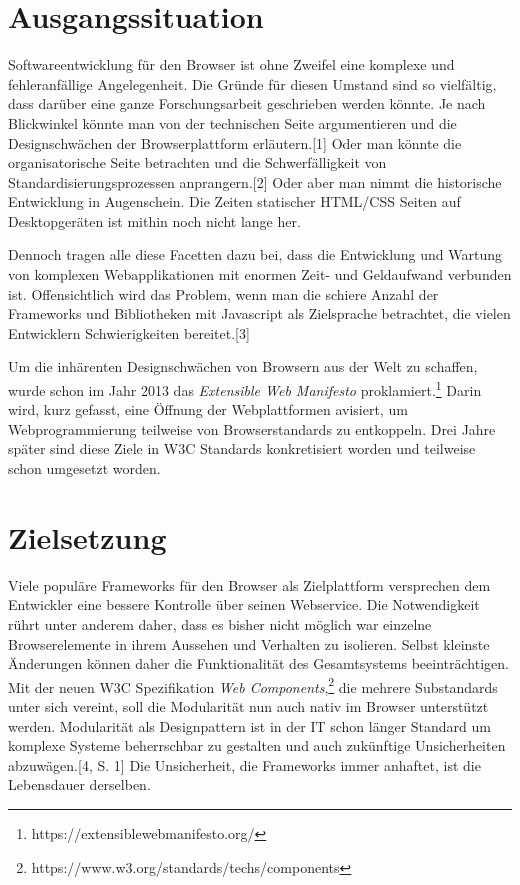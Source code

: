 \section{Ausgangssituation}\label{ausgangssituation}

Softwareentwicklung für den Browser ist ohne Zweifel eine komplexe und
fehleranfällige Angelegenheit. Die Gründe für diesen Umstand sind so
vielfältig, dass darüber eine ganze Forschungsarbeit geschrieben werden
könnte. Je nach Blickwinkel könnte man von der technischen Seite
argumentieren und die Designschwächen der Browserplattform
erläutern.{[}1{]} Oder man könnte die organisatorische Seite betrachten
und die Schwerfälligkeit von Standardisierungsprozessen
anprangern.{[}2{]} Oder aber man nimmt die historische Entwicklung in
Augenschein. Die Zeiten statischer HTML/CSS Seiten auf Desktopgeräten
ist mithin noch nicht lange her.

Dennoch tragen alle diese Facetten dazu bei, dass die Entwicklung und
Wartung von komplexen Webapplikationen mit enormen Zeit- und Geldaufwand
verbunden ist. Offensichtlich wird das Problem, wenn man die schiere
Anzahl der Frameworks und Bibliotheken mit Javascript als Zielsprache
betrachtet, die vielen Entwicklern Schwierigkeiten bereitet.{[}3{]}

Um die inhärenten Designschwächen von Browsern aus der Welt zu schaffen,
wurde schon im Jahr 2013 das \emph{Extensible Web Manifesto}
proklamiert.\footnote{https://extensiblewebmanifesto.org/} Darin wird,
kurz gefasst, eine Öffnung der Webplattformen avisiert, um
Webprogrammierung teilweise von Browserstandards zu entkoppeln. Drei
Jahre später sind diese Ziele in W3C Standards konkretisiert worden und
teilweise schon umgesetzt worden.

\section{Zielsetzung}\label{zielsetzung}

Viele populäre Frameworks für den Browser als Zielplattform versprechen
dem Entwickler eine bessere Kontrolle über seinen Webservice. Die
Notwendigkeit rührt unter anderem daher, dass es bisher nicht möglich
war einzelne Browserelemente in ihrem Aussehen und Verhalten zu
isolieren. Selbst kleinste Änderungen können daher die Funktionalität
des Gesamtsystems beeinträchtigen. Mit der neuen W3C Spezifikation
\emph{Web Components},\footnote{https://www.w3.org/standards/techs/components}
die mehrere Substandards unter sich vereint, soll die Modularität nun
auch nativ im Browser unterstützt werden. Modularität als Designpattern
ist in der IT schon länger Standard um komplexe Systeme beherrschbar zu
gestalten und auch zukünftige Unsicherheiten abzuwägen.{[}4, S. 1{]} Die
Unsicherheit, die Frameworks immer anhaftet, ist die Lebensdauer
derselben.

